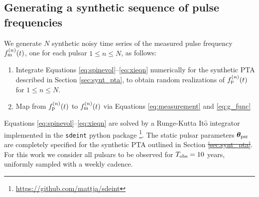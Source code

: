 \documentclass[fleqn,usenatbib,useAMS]{mnras}
\providecommand{\DIFadd}[1]{{\protect\color{blue}\uwave{#1}}} %
\providecommand{\DIFdel}[1]{{\protect\color{red}\sout{#1}}}                      %
\providecommand{\DIFaddbegin}{} %
\providecommand{\DIFaddend}{} %
\providecommand{\DIFdelbegin}{} %
\providecommand{\DIFdelend}{} %
\newcommand{\DIFscaledelfig}{0.5}
\newlength{\DIFdelgraphicswidth} %
\newlength{\DIFdelgraphicsheight} %
\newcommand{\DIFaddincludegraphics}[2][]{{\color{blue}\fbox{\DIFOincludegraphics[#1]{#2}}}} %
\newcommand{\DIFdelincludegraphics}[2][]{%
\sbox{\DIFdelgraphicsbox}{\DIFOincludegraphics[#1]{#2}}%
\settoboxwidth{\DIFdelgraphicswidth}{\DIFdelgraphicsbox} %
\settoboxtotalheight{\DIFdelgraphicsheight}{\DIFdelgraphicsbox} %
\scalebox{\DIFscaledelfig}{%
\parbox[b]{\DIFdelgraphicswidth}{\usebox{\DIFdelgraphicsbox}\\[-\baselineskip] \rule{\DIFdelgraphicswidth}{0em}}\llap{\resizebox{\DIFdelgraphicswidth}{\DIFdelgraphicsheight}{%
\setlength{\unitlength}{\DIFdelgraphicswidth}%
\begin{picture}(1,1)%
\thicklines\linethickness{2pt} %
{\color[rgb]{1,0,0}\put(0,0){\framebox(1,1){}}}%
{\color[rgb]{1,0,0}\put(0,0){\line( 1,1){1}}}%
{\color[rgb]{1,0,0}\put(0,1){\line(1,-1){1}}}%
\end{picture}%
}\hspace*{3pt}}} %
} %
\DeclareRobustCommand{\DIFaddbegin}{\DIFOaddbegin \let\includegraphics\DIFaddincludegraphics} %
\DeclareRobustCommand{\DIFaddend}{\DIFOaddend \let\includegraphics\DIFOincludegraphics} %
\DeclareRobustCommand{\DIFdelbegin}{\DIFOdelbegin \let\includegraphics\DIFdelincludegraphics} %
\DeclareRobustCommand{\DIFdelend}{\DIFOaddend \let\includegraphics\DIFOincludegraphics} %
\begin{document}
\subsection{Generating a synthetic sequence of pulse frequencies}\label{sec:gendata}
We generate $N$ synthetic noisy time series of the measured pulse frequency $f_{\rm m}^{(n)}(t)$, one for each pulsar $1\leq n \leq N$, as follows:
\begin{enumerate}[leftmargin=2em]
	\item Integrate Equations \eqref{eq:spinevol}--\eqref{eq:xieqn} numerically for the synthetic PTA described in Section \ref{sec:synt_pta}, to obtain random realizations of $f_{\rm p}^{(n)}(t)$ for $1\leq n \leq N$.
	\item Map from $f_{\rm p}^{(n)}(t)$ to $f_{\rm m}^{(n)}(t)$ via Equations \eqref{eq:measurement} and \eqref{eq:g_func}\DIFaddbegin \DIFadd{.
}\DIFaddend \end{enumerate}
Equations \eqref{eq:spinevol}--\eqref{eq:xieqn} are solved by a Runge-Kutta It$\hat{\text{o}}$ integrator implemented in the \texttt{sdeint} python package \footnote{\url{https://github.com/mattja/sdeint}}. The static pulsar parameters  $\boldsymbol{\theta}_{\rm psr}$ are completely specified for the synthetic PTA outlined in Section \DIFdelbegin \DIFdel{\eqref{sec:synt_pta}}\DIFdelend \DIFaddbegin \DIFadd{\ref{sec:synt_pta}}\DIFaddend . For this work we consider all pulsars to be observed for $T_{\rm obs} =10$ years, uniformly sampled with a weekly cadence. \DIFaddbegin \newline 
\end{document}
